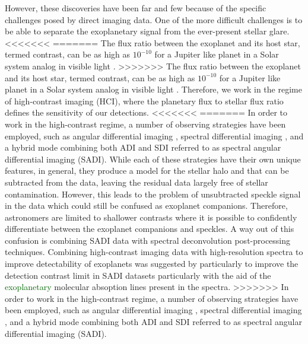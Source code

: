 \documentclass{aa}
\newcommand{\newchange}[1]{\textcolor{darkgreen}{#1}}
\begin{document}
{%
However, these discoveries have been far and few because of the specific challenges posed by direct imaging data.
One of the more difficult challenges is to be able to separate the exoplanetary signal from the ever-present stellar glare.
<<<<<<<
=======
The flux ratio between the exoplanet and its host star, termed contrast, can be as high as $10^{-10}$ for a Jupiter like planet in a Solar system analog in visible light \citep[ for e.g][]{2023Galicher}.
>>>>>>>
The flux ratio between the exoplanet and its host star, termed contrast, can be as high as $10^{-10}$ for a Jupiter like planet in a Solar system analog in visible light \citep[ for e.g][]{2023Galicher}.
Therefore, we work in the regime of high-contrast imaging (HCI), where the planetary flux to stellar flux ratio defines the sensitivity of our detections.
<<<<<<<
=======
In order to work in the high-contrast regime, a number of observing strategies have been employed, such as angular differential imaging \citep[ADI, ][]{Liu2004,2006MaroisADI}, spectral differential imaging \citep[SDI, ][]{2002SparksSDI}, and a hybrid mode combining both ADI and SDI referred to as spectral angular differential imaging (SADI).
While each of these strategies have their own unique features, in general, they produce a model for the stellar halo and that can be subtracted from the data, leaving the residual data largely free of stellar contamination.
However, this leads to the problem of unsubtracted speckle signal in the data which could still be confused as exoplanet companions.
Therefore, astronomers are limited to shallower contrasts where it is possible to confidently differentiate between the exoplanet companions and speckles.
A way out of this confusion is combining SADI data with spectral deconvolution post-processing techniques\cite[as for e.g. in, ][]{2002SparksSDI, 2007ThatteSDI}.
Combining high-contrast imaging data with high-resolution spectra to improve detectability of exoplanets was suggested by\cite{2015Snellen} particularly to improve the detection contrast limit in SADI datasets particularly with the aid of the \newchange{exoplanetary} molecular absoption lines present in the spectra.
>>>>>>>
In order to work in the high-contrast regime, a number of observing strategies have been employed, such as angular differential imaging \citep[ADI, ][]{Liu2004,2006MaroisADI}, spectral differential imaging \citep[SDI, ][]{2002SparksSDI}, and a hybrid mode combining both ADI and SDI referred to as spectral angular differential imaging (SADI).
}
\end{document}
